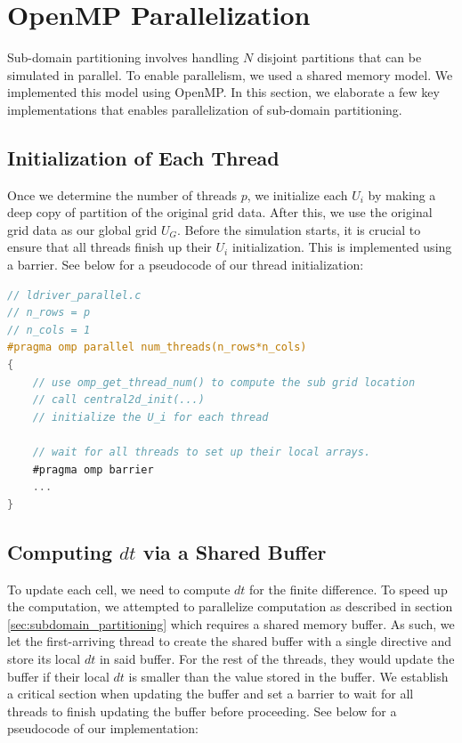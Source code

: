 \documentclass{article}
\begin{document}
\section{OpenMP Parallelization}
\label{sec: parallelization}
Sub-domain partitioning involves handling $N$ disjoint partitions that can be simulated in parallel.
To enable parallelism,
we used a shared memory model.
We implemented this model using OpenMP.
In this section, we elaborate a few key implementations that enables parallelization of sub-domain partitioning.

\subsection{Initialization of Each Thread}
Once we determine the number of threads $p$, we initialize each $U_i$ by making a deep copy of partition of the original grid data.
After this, we use the original grid data as our global grid $U_G$. Before the simulation starts, it is crucial to ensure that all threads finish up their $U_i$ initialization.
This is implemented using a barrier. See below for a pseudocode of our thread initialization:

\begin{lstlisting}[language=C]
// ldriver_parallel.c
// n_rows = p
// n_cols = 1
#pragma omp parallel num_threads(n_rows*n_cols)
{
    // use omp_get_thread_num() to compute the sub grid location
    // call central2d_init(...)
    // initialize the U_i for each thread

    // wait for all threads to set up their local arrays.
    #pragma omp barrier
    ...
}
\end{lstlisting}

\subsection{Computing $dt$ via a Shared Buffer}
To update each cell, we need to compute $dt$ for the finite difference. To speed up the computation,
we attempted to parallelize computation as described in section \ref{sec:subdomain_partitioning} which requires a shared
memory buffer. As such, we let the first-arriving thread to create the shared buffer with a single directive
and store its local $dt$ in said buffer. For the rest of the threads, they would update the buffer if their local $dt$ is smaller than
the value stored in the buffer.  We establish a critical section when updating the buffer and set a barrier to wait for all threads
to finish updating the buffer before proceeding. See below for a pseudocode of our implementation:
\end{document}
